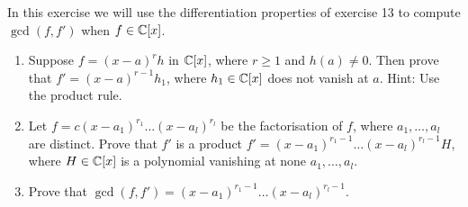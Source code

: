 \begin{exercise}{14}
In this exercise we will use the differentiation properties of exercise 13 to compute $\gcd(f,f')$ when $f\in\mathbb{C}[x]$.
\begin{enumerate}
    \item Suppose $f=(x-a)^rh$ in $\mathbb{C}[x]$, where $r\geq 1$ and $h(a)\neq 0$. Then prove that $f'=(x-a)^{r-1}h_1$, where $h_1\in\mathbb{C}[x]$ does not vanish at $a$. Hint: Use the product rule.
    \item Let $f=c(x-a_1)^{r_1}\dots(x-a_l)^{r_l}$ be the factorisation of $f$, where $a_1,\dots,a_l$ are distinct. Prove that $f'$ is a product $f'=(x-a_1)^{r_1-1}\dots(x-a_l)^{r_l-1}H$, where $H\in\mathbb{C}[x]$ is a polynomial vanishing at none $a_1,\dots,a_l$.
    \item Prove that $\gcd(f,f')=(x-a_1)^{r_1-1}\dots(x-a_l)^{r_l-1}$.
\end{enumerate}
\end{exercise}
